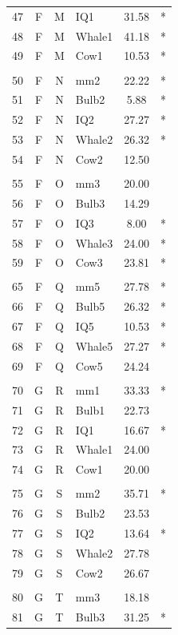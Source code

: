 \documentclass[12pt,nohyper]{tufte-handout}\usepackage[]{graphicx}\usepackage[]{color}
\begin{document}
\begin{longtable}{ccclcl}
   47 & F & M & IQ1 & 31.58 & * \\ 
   48 & F & M & Whale1 & 41.18 & * \\ 
   49 & F & M & Cow1 & 10.53 & * \\ 
   &  &  &  &  &  \\ 
   50 & F & N & mm2 & 22.22 & * \\ 
   51 & F & N & Bulb2 & 5.88 & * \\ 
   52 & F & N & IQ2 & 27.27 & * \\ 
   53 & F & N & Whale2 & 26.32 & * \\ 
   54 & F & N & Cow2 & 12.50 &  \\ 
   &  &  &  &  &  \\ 
   55 & F & O & mm3 & 20.00 &  \\ 
   56 & F & O & Bulb3 & 14.29 &  \\ 
   57 & F & O & IQ3 & 8.00 & * \\ 
   58 & F & O & Whale3 & 24.00 & * \\ 
   59 & F & O & Cow3 & 23.81 & * \\ 
   &  &  &  &  &  \\ 
   65 & F & Q & mm5 & 27.78 & * \\ 
   66 & F & Q & Bulb5 & 26.32 & * \\ 
   67 & F & Q & IQ5 & 10.53 & * \\ 
   68 & F & Q & Whale5 & 27.27 & * \\ 
   69 & F & Q & Cow5 & 24.24 &  \\ 
   &  &  &  &  &  \\ 
   70 & G & R & mm1 & 33.33 & * \\ 
   71 & G & R & Bulb1 & 22.73 &  \\ 
   72 & G & R & IQ1 & 16.67 & * \\ 
   73 & G & R & Whale1 & 24.00 &  \\ 
   74 & G & R & Cow1 & 20.00 &  \\ 
   &  &  &  &  &  \\ 
   75 & G & S & mm2 & 35.71 & * \\ 
   76 & G & S & Bulb2 & 23.53 &  \\ 
   77 & G & S & IQ2 & 13.64 & * \\ 
   78 & G & S & Whale2 & 27.78 &  \\ 
   79 & G & S & Cow2 & 26.67 &  \\ 
   &  &  &  &  &  \\ 
   80 & G & T & mm3 & 18.18 &  \\ 
   81 & G & T & Bulb3 & 31.25 & * \\ 

\end{longtable}
\end{document}

